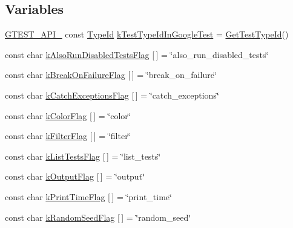 \subsection*{Variables}
\begin{DoxyCompactItemize}
\item 
\hyperlink{gtest-port_8h_aa73be6f0ba4a7456180a94904ce17790}{G\-T\-E\-S\-T\-\_\-\-A\-P\-I\-\_\-} const \hyperlink{namespacetesting_1_1internal_a38c435cbab5f8b784e2e7f3356cab242}{Type\-Id} \hyperlink{namespacetesting_1_1internal_acac7993efabbd9dd62c1e9c7d143a72f}{k\-Test\-Type\-Id\-In\-Google\-Test} = \hyperlink{namespacetesting_1_1internal_ad0d66d56ead224263cd100c1d6bfc562}{Get\-Test\-Type\-Id}()
\item 
const char \hyperlink{namespacetesting_1_1internal_a2c66dd28db3875de41836ffb69f5e38f}{k\-Also\-Run\-Disabled\-Tests\-Flag} \mbox{[}$\,$\mbox{]} = \char`\"{}also\-\_\-run\-\_\-disabled\-\_\-tests\char`\"{}
\item 
const char \hyperlink{namespacetesting_1_1internal_a3ac1c81fca74b3efd59ad92b8c87607c}{k\-Break\-On\-Failure\-Flag} \mbox{[}$\,$\mbox{]} = \char`\"{}break\-\_\-on\-\_\-failure\char`\"{}
\item 
const char \hyperlink{namespacetesting_1_1internal_a425758b6c799546541730db3069ab6ca}{k\-Catch\-Exceptions\-Flag} \mbox{[}$\,$\mbox{]} = \char`\"{}catch\-\_\-exceptions\char`\"{}
\item 
const char \hyperlink{namespacetesting_1_1internal_abd2c557df2babd71d213882d4a9dd5c5}{k\-Color\-Flag} \mbox{[}$\,$\mbox{]} = \char`\"{}color\char`\"{}
\item 
const char \hyperlink{namespacetesting_1_1internal_a81f3deec3ebb5c25e9e71f0ec088302c}{k\-Filter\-Flag} \mbox{[}$\,$\mbox{]} = \char`\"{}filter\char`\"{}
\item 
const char \hyperlink{namespacetesting_1_1internal_a1042c47d58fd11f22540c9b4e463b20a}{k\-List\-Tests\-Flag} \mbox{[}$\,$\mbox{]} = \char`\"{}list\-\_\-tests\char`\"{}
\item 
const char \hyperlink{namespacetesting_1_1internal_a634b057c35286dfe481716ddfca5b334}{k\-Output\-Flag} \mbox{[}$\,$\mbox{]} = \char`\"{}output\char`\"{}
\item 
const char \hyperlink{namespacetesting_1_1internal_acf0224d65402c6f7a60ff8a11d313896}{k\-Print\-Time\-Flag} \mbox{[}$\,$\mbox{]} = \char`\"{}print\-\_\-time\char`\"{}
\item 
const char \hyperlink{namespacetesting_1_1internal_a7baa4bf341b58cc6ecb77c338df94972}{k\-Random\-Seed\-Flag} \mbox{[}$\,$\mbox{]} = \char`\"{}random\-\_\-seed\char`\"{}

\end{DoxyCompactItemize}
